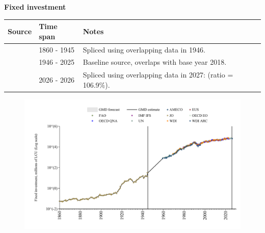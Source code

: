 \documentclass[12pt,a4paper,landscape]{article}
\begin{document}
\begin{adjustbox}{max totalsize={\paperwidth}{\paperheight},center}
\begin{minipage}[t][\textheight][t]{\textwidth}
\vspace*{0.5cm}
{}
\begin{center}
{\Large\bfseries Fixed investment}
\end{center}
\vspace{0.5cm}
\begin{table}[H]
\centering
\small
\begin{tabular}{|l|l|l|}
\hline
\textbf{Source} & \textbf{Time span} & \textbf{Notes} \\
\hline
\rowcolor{white}\cite{JO}& 1860 - 1945 &Spliced using overlapping data in 1946. \\
\rowcolor{lightgray}\cite{OECD_EO}& 1946 - 2025 &Baseline source, overlaps with base year 2018. \\
\rowcolor{white}\cite{AMECO}& 2026 - 2026 &Spliced using overlapping data in 2027: (ratio = 106.9\%). \\
\hline
\end{tabular}
\end{table}
\begin{figure}[H]
\centering
\includegraphics[width=\textwidth,height=0.6\textheight,keepaspectratio]{graphs/FIN_finv.pdf}
\end{figure}
\end{minipage}
\end{adjustbox}
\end{document}
